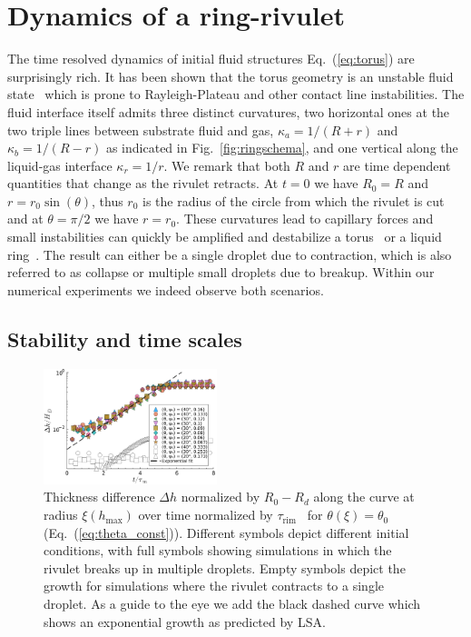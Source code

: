 \documentclass[twoside,twocolumn,9pt]{article}
\begin{document}
\section{Dynamics of a ring-rivulet}
\label{sec:dynamics}
The time resolved dynamics of initial fluid structures Eq.~(\ref{eq:torus}) are surprisingly rich.
It has been shown that the torus geometry is an unstable fluid state~\cite{gonzalezStabilityLiquidRing2013, mehrabianCapillaryBreakupLiquid2013} which is prone to Rayleigh-Plateau and other contact line instabilities. 
The fluid interface itself admits three distinct curvatures, two horizontal ones at the two triple lines between substrate fluid and gas, $\kappa_a = 1/(R+r)$ and $\kappa_b = 1/(R-r)$ as indicated in Fig.~\ref{fig:ringschema}, and one vertical along the liquid-gas interface $\kappa_r = 1/r$.
We remark that both $R$ and $r$ are time dependent quantities that change as the rivulet retracts.
At $t=0$ we have $R_0 = R$ and $r = r_0\sin(\theta)$, thus $r_0$ is the radius of the circle from which the rivulet is cut and at $\theta = \pi/2$ we have $r=r_0$.
These curvatures lead to capillary forces and small instabilities can quickly be amplified and destabilize a torus~\cite{mehrabianCapillaryBreakupLiquid2013} or a liquid ring~\cite{gonzalezStabilityLiquidRing2013}. 
The result can either be a single droplet due to contraction, which is also referred to as collapse or multiple small droplets due to breakup.
Within our numerical experiments we indeed observe both scenarios.

\subsection{Stability and time scales}\label{subsec:stability}
\begin{figure}
    \centering
    \includegraphics[width=0.45\textwidth]{assets/growth-breakup.pdf}
    \caption{Thickness difference $\Delta h$ normalized by $R_0 - R_d$ along the curve at radius $\xi(h_{\max})$ over time normalized by $\tau_{\text{rim}}$~\cite{edwardsNotSpreadingReverse2016} for $\theta(\xi) = \theta_0$ (Eq.~(\ref{eq:theta_const})). 
    Different symbols depict different initial conditions, with full symbols showing simulations in which the rivulet breaks up in multiple droplets. 
    Empty symbols depict the growth for simulations where the rivulet contracts to a single droplet. 
    As a guide to the eye we add the black dashed curve which shows an exponential growth as predicted by LSA.
    }
    \label{fig:first_growth}
\end{figure}
\end{document}
